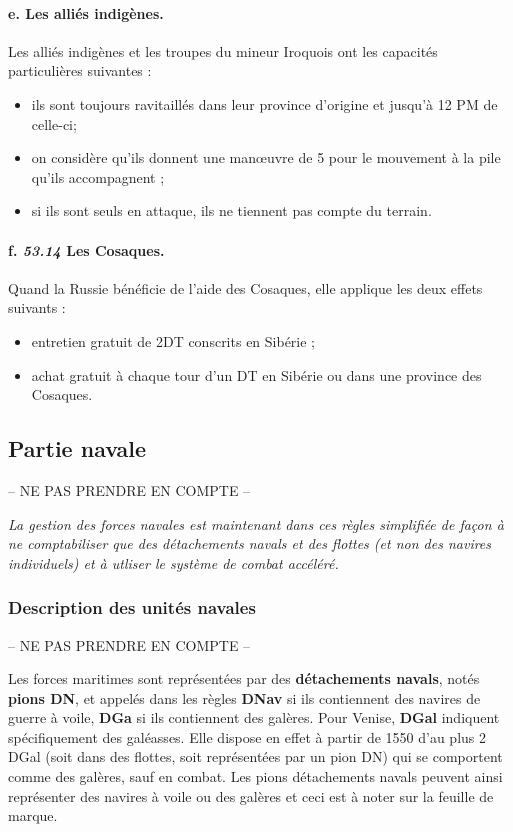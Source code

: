 \paragraph{e. Les alliés indigènes.}\label{chMilitary:Movement:Indian forces}
Les alliés indigènes et les troupes du mineur Iroquois ont les capacités particulières
suivantes :
\begin{itemize}
\item ils sont toujours ravitaillés dans leur province d'origine et jusqu'à 12 PM de
celle-ci;
\item on considère qu'ils donnent une man{\oe}uvre de 5 pour le mouvement à la pile
qu'ils accompagnent ;
\item si ils sont seuls en attaque, ils ne tiennent pas compte du terrain.
\end{itemize}

\paragraph{f. \textit{53.14} Les Cosaques.}
Quand la Russie bénéficie de l'aide des Cosaques, elle applique les deux
effets suivants :
\begin{itemize}
\item entretien gratuit de 2DT conscrits en Sibérie ;
\item achat gratuit à chaque tour d'un DT en Sibérie ou dans une province des Cosaques.
\end{itemize}


\subsection{Partie navale}
-- NE PAS PRENDRE EN COMPTE --


\emph{La gestion des forces navales est maintenant dans ces règles simplifiée
de façon à ne comptabiliser que des détachements navals
et des flottes (et non des navires individuels) et à utliser le système
de combat accéléré.}


\subsubsection{Description des unités navales}
-- NE PAS PRENDRE EN COMPTE --

Les forces maritimes sont représentées par des \textbf{détachements navals},
notés \textbf{pions DN}, et appelés dans les règles
\textbf{DNav} si ils contiennent des navires de guerre à voile,
{\bf DGa} si ils
contiennent des galères. Pour Venise, {\bf DGal} indiquent spécifiquement des
galéasses. Elle dispose en effet à partir de 1550 d'au plus
2 DGal (soit dans des flottes, soit
représentées par un pion DN) qui se comportent comme des galères, sauf
en combat.
Les pions détachements navals peuvent ainsi représenter des navires
à voile ou des galères et ceci est à noter sur la feuille de marque.
\medskip

